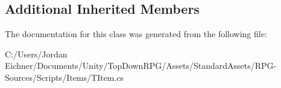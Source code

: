 \subsection*{Additional Inherited Members}


The documentation for this class was generated from the following file\+:\begin{DoxyCompactItemize}
\item 
C\+:/\+Users/\+Jordan Eichner/\+Documents/\+Unity/\+Top\+Down\+R\+P\+G/\+Assets/\+Standard\+Assets/\+R\+P\+G-\/\+Sources/\+Scripts/\+Items/T\+Item.\+cs\end{DoxyCompactItemize}
